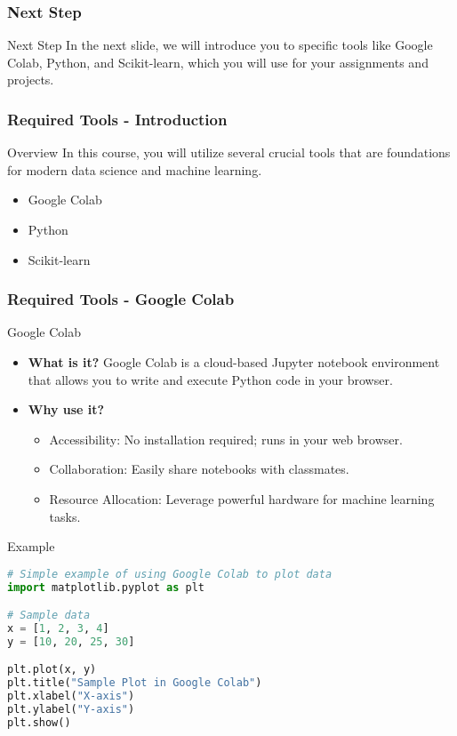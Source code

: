 \documentclass[aspectratio=169]{beamer}
\begin{document}
\begin{frame}[fragile]
    \frametitle{Next Step}
    \begin{block}{Next Step}
        In the next slide, we will introduce you to specific tools like Google Colab, Python, and Scikit-learn, which you will use for your assignments and projects.
    \end{block}
\end{frame}

\begin{frame}[fragile]
    \frametitle{Required Tools - Introduction}
    \begin{block}{Overview}
        In this course, you will utilize several crucial tools that are foundations for modern data science and machine learning.
    \end{block}
    \begin{itemize}
        \item Google Colab
        \item Python
        \item Scikit-learn
    \end{itemize}
\end{frame}

\begin{frame}[fragile]
    \frametitle{Required Tools - Google Colab}
    \begin{block}{Google Colab}
        \begin{itemize}
            \item \textbf{What is it?}
            Google Colab is a cloud-based Jupyter notebook environment that allows you to write and execute Python code in your browser.

            \item \textbf{Why use it?}
            \begin{itemize}
                \item Accessibility: No installation required; runs in your web browser.
                \item Collaboration: Easily share notebooks with classmates.
                \item Resource Allocation: Leverage powerful hardware for machine learning tasks.
            \end{itemize}
        \end{itemize}
    \end{block}
    \begin{block}{Example}
        \begin{lstlisting}[language=Python]
# Simple example of using Google Colab to plot data
import matplotlib.pyplot as plt

# Sample data
x = [1, 2, 3, 4]
y = [10, 20, 25, 30]

plt.plot(x, y)
plt.title("Sample Plot in Google Colab")
plt.xlabel("X-axis")
plt.ylabel("Y-axis")
plt.show()
        \end{lstlisting}
    \end{block}
\end{frame}
\end{document}
